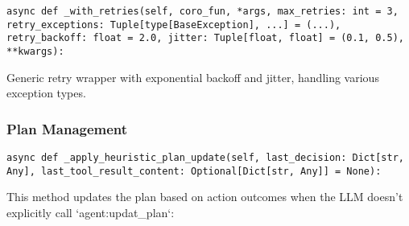 \documentclass[12pt,a4paper]{article}
\begin{document}
\begin{pageablecode}
\begin{verbatim}
async def _with_retries(self, coro_fun, *args, max_retries: int = 3, retry_exceptions: Tuple[type[BaseException], ...] = (...), retry_backoff: float = 2.0, jitter: Tuple[float, float] = (0.1, 0.5), **kwargs):
\end{verbatim}
\end{pageablecode}
Generic retry wrapper with exponential backoff and jitter, handling various exception types.

\subsubsection*{Plan Management}
\begin{pageablecode}
\begin{verbatim}
async def _apply_heuristic_plan_update(self, last_decision: Dict[str, Any], last_tool_result_content: Optional[Dict[str, Any]] = None):
\end{verbatim}
\end{pageablecode}
This method updates the plan based on action outcomes when the LLM doesn't explicitly call `agent:updat\1\_plan`:
\end{document}
